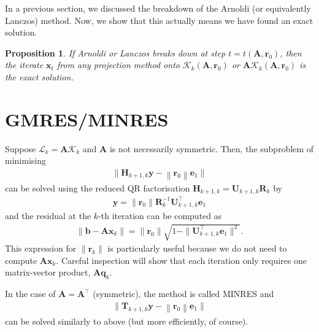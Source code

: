 \documentclass[12pt,a4paper]{article} %
\newtheorem*{proposition}{Proposition}
\begin{document}
In a previous section, we discussed the breakdown of the Arnoldi (or equivalently Lanczos)
method. Now, we show that this actually means we have found an exact solution.
\begin{proposition}
    If Arnoldi or Lanczos breaks down at step $t = t(\mathbf A, \bm r_0)$, 
    then the iterate $\bm x_t$ from any projection method onto 
    $\mathcal K_k(\mathbf A, \bm r_0)$ or $\mathbf A \mathcal K_k(\mathbf A, \bm r_0)$
    is the exact solution.
\end{proposition}

\section{GMRES/MINRES}
Suppose $\mathcal L_k = \mathbf A\mathcal K_k$ and $\mathbf A$ is not necessarily symmetric. 
Then, the subproblem of minimising
\begin{align*}
    \Big\|\mathbf{H}_{k+1,k} \bm{y}-\left\|\bm{r}_{0}\right\| \bm{e}_{1}\Big\|
\end{align*}
can be solved using the reduced QR factorisation $\mathbf{H}_{k+1,k} = \mathbf U_{k+1,k}\mathbf R_k$
by
\begin{align*}
    \bm y = \| \bm r_0 \| \mathbf R_k^{-1} \mathbf U_{k+1,k}^\top \bm e_1
\end{align*}
and the residual at the $k$-th iteration can be computed as 
\begin{align*}
    \| \bm b - \mathbf A \bm x_k \| = \| \bm r_0 \| \sqrt{1 - \|\mathbf U_{k+1,k}^\top \bm e_1 \|^2}.
\end{align*}
This expression for $\| \bm r_k\|$ is particularly useful because we do not need to compute  $\mathbf A \bm x_k$.
Careful inspection will show that each iteration only requires one matrix-vector product, 
$\mathbf A \bm q_k$.

In the case of $\mathbf A = \mathbf A^\top$ (symmetric), the method is 
called MINRES and 
\begin{align*}
    \Big\|\mathbf{T}_{k+1,k} \bm{y}-\left\|\bm{r}_{0}\right\| \bm{e}_{1}\Big\|
\end{align*}
can be solved similarly to above (but more efficiently, of course).
\end{document}
